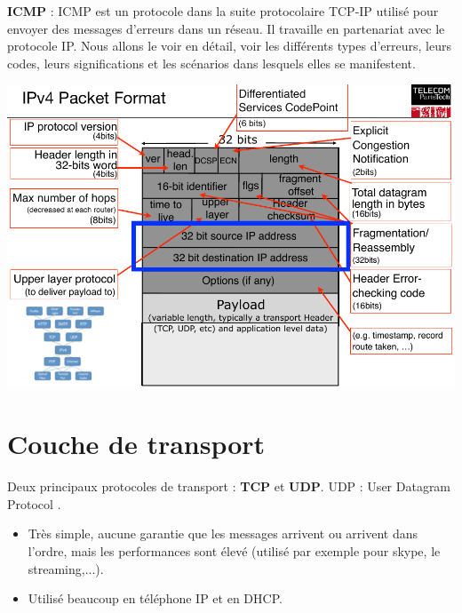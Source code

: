 \documentclass[a4paper,9pt, twocolumn]{article}
\begin{document}
	\textbf{ICMP} : ICMP est un protocole dans la suite protocolaire TCP-IP utilisé pour envoyer des messages d'erreurs dans un réseau.
	Il travaille en partenariat avec le protocole IP.
	Nous allons le voir en détail, voir les différents types d'erreurs, leurs codes, leurs significations et les scénarios dans lesquels elles se manifestent.
	
	\begin{center}
	\includegraphics[scale=0.24]{IPv4-Packet.png}
	\end{center}


\section*{Couche de transport}

	Deux principaux protocoles de transport : \textbf{TCP} et \textbf{UDP}.
	UDP : User Datagram Protocol .
	\begin{itemize}
		\item Très simple, aucune garantie que les messages arrivent ou arrivent dans l'ordre, mais les performances sont élevé (utilisé par exemple pour skype, le streaming,...).
		\item Utilisé beaucoup en téléphone IP et en DHCP.
	\end{itemize}
	
\end{document}
